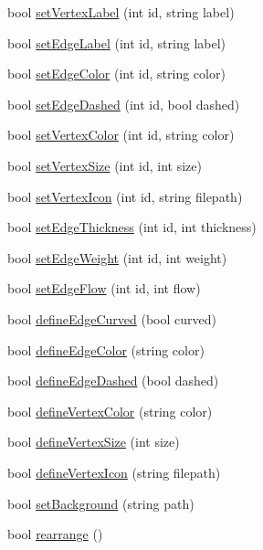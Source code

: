 \begin{DoxyCompactItemize}
bool \mbox{\hyperlink{class_graph_viewer_ac25d7d007022fda16799808ba136e909}{set\+Vertex\+Label}} (int id, string label)
\item 
bool \mbox{\hyperlink{class_graph_viewer_a447cca0064e785654c2105602c2961ca}{set\+Edge\+Label}} (int id, string label)
\item 
bool \mbox{\hyperlink{class_graph_viewer_a07ccc96707efae4aa5f3ced3dca015af}{set\+Edge\+Color}} (int id, string color)
\item 
bool \mbox{\hyperlink{class_graph_viewer_a1698f1c6b3a8e7cabc7b7d7cf42fc7f0}{set\+Edge\+Dashed}} (int id, bool dashed)
\item 
bool \mbox{\hyperlink{class_graph_viewer_a8b542d7e09e81a45a74760c19233beb0}{set\+Vertex\+Color}} (int id, string color)
\item 
bool \mbox{\hyperlink{class_graph_viewer_ae930dfdfcdeb7a871eefb6028d74b9f9}{set\+Vertex\+Size}} (int id, int size)
\item 
bool \mbox{\hyperlink{class_graph_viewer_a02d5f7393eab9a2d1b66719039597a64}{set\+Vertex\+Icon}} (int id, string filepath)
\item 
bool \mbox{\hyperlink{class_graph_viewer_a07f598272fe3515455eab13be749604a}{set\+Edge\+Thickness}} (int id, int thickness)
\item 
bool \mbox{\hyperlink{class_graph_viewer_ac211de009a0afe2e6d44f4f8d030a2cc}{set\+Edge\+Weight}} (int id, int weight)
\item 
bool \mbox{\hyperlink{class_graph_viewer_a69eb065145063e4dea41961e92e35c8e}{set\+Edge\+Flow}} (int id, int flow)
\item 
bool \mbox{\hyperlink{class_graph_viewer_a08f362be0e682d91e7506dca8caae1b8}{define\+Edge\+Curved}} (bool curved)
\item 
bool \mbox{\hyperlink{class_graph_viewer_a4102580b69826ba83251ef7bb262f8be}{define\+Edge\+Color}} (string color)
\item 
bool \mbox{\hyperlink{class_graph_viewer_af785279b5c204df0e274b20c36276fc3}{define\+Edge\+Dashed}} (bool dashed)
\item 
bool \mbox{\hyperlink{class_graph_viewer_a76de8676b7a93d72af514b84cdaa4d21}{define\+Vertex\+Color}} (string color)
\item 
bool \mbox{\hyperlink{class_graph_viewer_ac4b2a9fec74d38e64088aa79ca4b7d9b}{define\+Vertex\+Size}} (int size)
\item 
bool \mbox{\hyperlink{class_graph_viewer_af1adb6a361457187a820e01dcf0a34b7}{define\+Vertex\+Icon}} (string filepath)
\item 
bool \mbox{\hyperlink{class_graph_viewer_a02437b5fecd8b90de24436068312d593}{set\+Background}} (string path)
\item 
bool \mbox{\hyperlink{class_graph_viewer_a3009a66958686ccb7e78b68e37c3c423}{rearrange}} ()
\end{DoxyCompactItemize}
